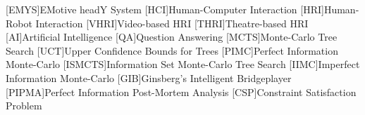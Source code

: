 \renewcommand{\listofacronymsname}{Glossary}
\listofacronyms

\begin{acronym}[PIPMA]
[EMYS]{EMotive headY System}
[HCI]{Human-Computer Interaction}
[HRI]{Human-Robot Interaction}
[VHRI]{Video-based HRI}
[THRI]{Theatre-based HRI}
[AI]{Artificial Intelligence}
[QA]{Question Answering}
[MCTS]{Monte-Carlo Tree Search}
[UCT]{Upper Confidence Bounds for Trees}
[PIMC]{Perfect Information Monte-Carlo}
[ISMCTS]{Information Set Monte-Carlo Tree Search}
[IIMC]{Imperfect Information Monte-Carlo}
[GIB]{Ginsberg's Intelligent Bridgeplayer}
[PIPMA]{Perfect Information Post-Mortem Analysis}
[CSP]{Constraint Satisfaction Problem}
\end{acronym}

\cleardoublepage


